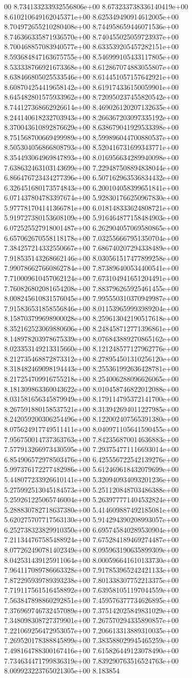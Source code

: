 00	8.734133233932556806e+00	8.673233738336140419e+00	8.610210649162045371e+00	8.625349490914612005e+00	8.704972655210280408e+00	8.744958659446071536e+00	8.746366335871936570e+00	8.740455025059723937e+00	8.700468857083940577e+00	8.633539205457282151e+00	8.593684847163675755e+00	8.546999105433117805e+00	8.533338766921673368e+00	8.612867074883055807e+00	8.638466805025533546e+00	8.614451057157642921e+00	8.608704254419658142e+00	8.619174336150059901e+00	8.645482801575933962e+00	8.720950237455820542e+00	8.744127368662926614e+00	8.469026120207132635e+00	8.244140618232703943e+00	8.266367203097335192e+00	8.370043610892876629e+00	8.638679041929533398e+00	8.751568700669499989e+00	8.599896044700880537e+00	8.505304056866808793e+00	8.520416731699343771e+00	8.354493064969847893e+00	8.016956634289940098e+00	7.638632463103143699e+00	7.229487508894838044e+00	6.866476723434277396e+00	6.507162963536834432e+00	6.326451680173574843e+00	6.200104058399651841e+00	6.071437804783397674e+00	5.928301766250967830e+00	5.977781704141366781e+00	6.018148333624808721e+00	5.919727380153608109e+00	5.916464877158484903e+00	6.072525527918001487e+00	6.262904057069580865e+00	6.657062670558118178e+00	7.032556667951350704e+00	7.384257214332550667e+00	7.686740207294338489e+00	7.918535143268662146e+00	8.030561517477899258e+00	7.990786627660862784e+00	7.873896400534400541e+00	7.710009610457062124e+00	7.673104941651204491e+00	7.760826802081654208e+00	7.883796265925461455e+00	8.008245610831576045e+00	7.995550310370949987e+00	7.915836531858556846e+00	8.011539659993989204e+00	8.158703799698900028e+00	8.259613042190517618e+00	8.352162523069880606e+00	8.248458712771396861e+00	8.148978203978675339e+00	8.076843889270865162e+00	8.023353149213315660e+00	8.121248577127962776e+00	8.212735468872873312e+00	8.278954501310256120e+00	8.318482469098194443e+00	8.255361992636428781e+00	8.217254709916755218e+00	8.254006288096626065e+00	8.181309863360043622e+00	8.010458746822012088e+00	8.031581656345879949e+00	8.179114795372141700e+00	8.267591880158537521e+00	8.313942694011227985e+00	8.242059200306254496e+00	8.122002407565391380e+00	8.075624917749511411e+00	8.040971105641590455e+00	7.956750014737363763e+00	7.842356870014636883e+00	7.577913266973430595e+00	7.293754771116693014e+00	6.854906572978503476e+00	6.425556722542139276e+00	5.997376172277482986e+00	5.612469618432079699e+00	5.448077233926610141e+00	5.320940934093201236e+00	5.275992513045184573e+00	5.251120848703486388e+00	5.259261225065746004e+00	5.263977771404532824e+00	5.288830782718637380e+00	5.414609887492185081e+00	5.620275707717563130e+00	5.914294390208993057e+00	6.252738323829910350e+00	6.695745840289530904e+00	7.211344767585488924e+00	7.675284189469274487e+00	8.077262490781402349e+00	8.095963190635899309e+00	8.042531439125911064e+00	8.000596641610133730e+00	7.964117089786663328e+00	7.917853965242421133e+00	7.872295939789393238e+00	7.801338307752213375e+00	7.719117561516458892e+00	7.639581051197044559e+00	7.563847898860292851e+00	7.459576377734626895e+00	7.376969746732457089e+00	7.375142025849831029e+00	7.348098308727379901e+00	7.267570294335890857e+00	7.221069256472953057e+00	7.206613313889310035e+00	7.269520178388845899e+00	7.383588029945465259e+00	7.498164788300167416e+00	7.615826449123078490e+00	7.734634471799836319e+00	7.839290763516524763e+00	8.009923223765021305e+00	8.183854